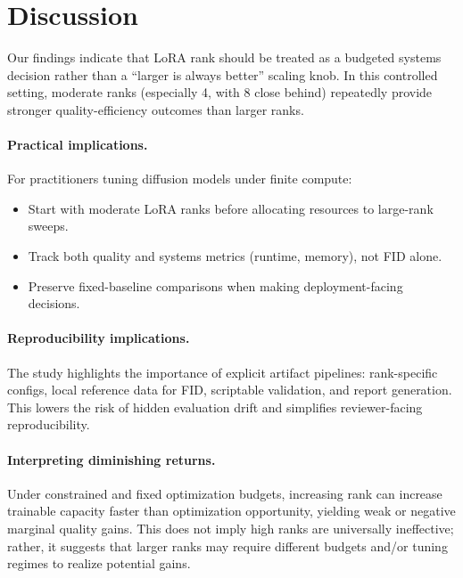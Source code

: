 \section{Discussion}

Our findings indicate that LoRA rank should be treated as a budgeted systems decision rather than a ``larger is always better'' scaling knob. In this controlled setting, moderate ranks (especially 4, with 8 close behind) repeatedly provide stronger quality-efficiency outcomes than larger ranks.

\paragraph{Practical implications.}
For practitioners tuning diffusion models under finite compute:
\begin{itemize}[leftmargin=1.5em]
  \item Start with moderate LoRA ranks before allocating resources to large-rank sweeps.
  \item Track both quality and systems metrics (runtime, memory), not FID alone.
  \item Preserve fixed-baseline comparisons when making deployment-facing decisions.
\end{itemize}

\paragraph{Reproducibility implications.}
The study highlights the importance of explicit artifact pipelines: rank-specific configs, local reference data for FID, scriptable validation, and report generation. This lowers the risk of hidden evaluation drift and simplifies reviewer-facing reproducibility.

\paragraph{Interpreting diminishing returns.}
Under constrained and fixed optimization budgets, increasing rank can increase trainable capacity faster than optimization opportunity, yielding weak or negative marginal quality gains. This does not imply high ranks are universally ineffective; rather, it suggests that larger ranks may require different budgets and/or tuning regimes to realize potential gains.
